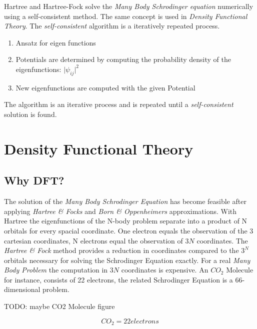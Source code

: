 Hartree and Hartree-Fock solve the \textit{Many Body Schrodinger equation}  numerically using a self-consistent method. The same concept is used in \textit{Density Functional Theory}. The \textit{self-consistent} algorithm is a iteratively repeated process. 
\begin{enumerate}
	\item Ansatz for eigen functions
	\item Potentials are determined by computing the probability density of the eigenfunctions: $ {\lvert  \psi_{ij} \rvert^2}$
	\item  New eigenfunctions are computed with the given Potential
\end{enumerate}

 The algorithm is an iterative process and is repeated until a \textit{self-consistent} solution is found. 





\section{Density Functional Theory}
\label{section:2.2}
\subsection{Why DFT?}
\label{subsection:2.2.1}

The solution of the \textit{Many Body Schrodinger Equation} has become feasible after applying \textit{Hartree \&  Focks} and \textit{Born \& Oppenheimers} approximations. With Hartree the eigenfunctions  of the N-body problem separate into a product of N orbitals for every spacial coordinate. One electron equals the observation of the 3 cartesian coordinates, N electrons equal the observation of $3N$ coordinates. The \textit{Hartree & Fock} method provides a reduction in coordinates compared to the $3^N$ orbitals necessary for solving the  Schrodinger Equation exactly. For a real \textit{Many Body Problem} the computation in $3N$ coordinates is expensive. An $CO_2$ Molecule for instance, consists of 22 electrons, the related Schrodinger Equation is a 66-dimensional problem. 

TODO: maybe CO2 Molecule figure


\begin{equation}
	CO_2 = 22 electrons
	\label{eq:co2}
\end{equation}

